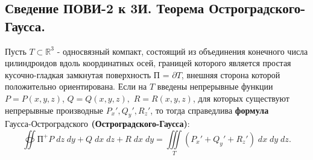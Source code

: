 \subsection{Сведение ПОВИ-2 к 3И. Теорема Остроградского-Гаусса.} %

Пусть $ T \subset \mathbb{R}^3 $ - односвязный компакт, состоящий из объединения конечного числа цилиндроидов вдоль координатных осей, границей которого является 
простая кусочно-гладкая замкнутая поверхность П = $ \partial T $, внешняя сторона которой положительно ориентирована. Если на $ T $ введены непрерывные функции 
$ P = P(x,y,z) $, $ Q = Q(x,y,z), $ $ R = R(x,y,z) $, для которых существуют непрерывные производные $ P_x', Q_y', R_z' $, то тогда справедлива
\textbf{формула $ \text{Гаусса-Остроградского} $ (Остроградского-Гаусса)}:
\begin{equation}
    \label{930}
    \oiint{\text{П}^{+}}{} P \; dz \; dy + Q \; dx \; dz + R \; dx \; dy =
    \iiint\limits_T (P_x' + Q_y' + R_z') \; dx \; dy \; dz.
\end{equation}

